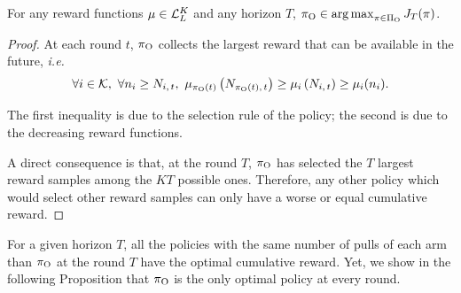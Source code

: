 \begin{proposition}
\label{prop:heidari-oracle}
For any reward functions $\mu \in \mathcal{L}_L^K$ and any horizon $T$, $\pi_{\rm O} \in \operatorname*{arg\,max}_{\pi \in \Pi_{\rm O}} J_T(\pi)$.
\end{proposition}%
\begin{proof}

At each round $t$, $\pi_{\rm O}$ collects the largest reward that can be available in the future, \textit{i.e.} 
\[
\forall i \in \mathcal{K}, \ \forall n_i \geq N_{i,\,t}, \ \mu_{\pi_{\rm O}(t)}\left(N_{\pi_{\rm O}(t),\,t}\right) \geq\mu_{i}\left(N_{i,\,t}\right)  \geq \mu_i(n_i).
\]

The first inequality is due to the selection rule of the policy; the second is due to the decreasing reward functions. 

A direct consequence is that, at the round $T$, $\pi_{\rm O}$ has selected the $T$ largest reward samples among the $KT$ possible ones. Therefore, any other policy which would select other reward samples can only have a worse or equal cumulative reward. 
\end{proof}

For a given horizon $T$, all the policies with the same number of pulls of each arm than $\pi_{\rm O}$ at the round $T$ have the optimal cumulative reward. Yet, we show in the following Proposition that $\pi_{\rm O}$ is the only optimal policy at every round.


